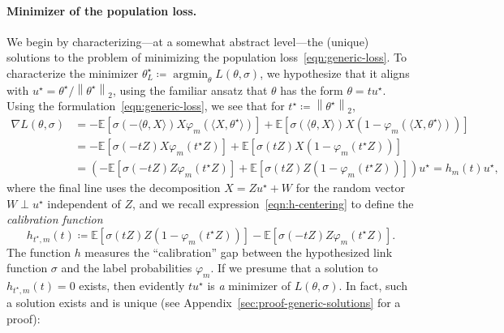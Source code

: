 \documentclass[11pt]{article}
\newcommand{\E}{\mathbb{E}}
\newcommand{\norm}[1]{\left\|{#1}\right\|} %
\newcommand{\ltwo}[1]{\norm{#1}_2} %
\newcommand{\<}{\langle} %
\renewcommand{\>}{\rangle}
\DeclareMathOperator*{\argmin}{argmin}
\newcommand{\defeq}{\coloneqq}
\newcommand{\opt}{^\star}
\begin{document}
\paragraph{Minimizer of the population loss.}
We begin by characterizing---at a somewhat abstract level---the (unique)
solutions to the problem of minimizing the population
loss~\eqref{eqn:generic-loss}.  To characterize the minimizer $\theta\opt_L
\defeq \argmin_\theta L(\theta, \sigma)$, we hypothesize that it aligns with $u\opt
= \theta\opt / \ltwo{\theta\opt}$, using the familiar
ansatz that $\theta$ has
the form $\theta = t u\opt$. Using the formulation~\eqref{eqn:generic-loss},
we see that for $t\opt \defeq \ltwo{\theta\opt}$,
\begin{align}
	\nabla L(\theta, \sigma) &
	= -\E[\sigma(-\<\theta, X\>) X
	\varphi_m(\<X, \theta\opt\>)]
	+ \E[\sigma(\<\theta, X\>) X (1 - \varphi_m(\<X, \theta\opt\>))]
	\nonumber \\
	& = -\E[\sigma(- t Z) X \varphi_m(t\opt   Z)]
	+  \E[\sigma(tZ) X (1 - \varphi_m(t\opt Z))] \nonumber \\
	& = \left(-\E[\sigma(- tZ) Z \varphi_m(t\opt Z)] 
	+ \E[\sigma(tZ) Z (1 - \varphi_m(t\opt Z))] \right) u\opt
	= h_m(t) u\opt, \label{eqn:generic-gradient}
\end{align}
where the final line uses the decomposition $X = Z u\opt + W$ for the random
vector $W \perp u\opt$ independent of $Z$, and we recall
expression~\eqref{eqn:h-centering} to define the
\emph{calibration function}
\begin{equation}
  \label{eqn:h-m-func}
  h_{t\opt, m}(t) \defeq \E[\sigma(tZ) Z (1 - \varphi_m(t\opt Z))]
  - \E[\sigma(-t Z) Z \varphi_m(t\opt Z)].
\end{equation}
The function $h$ measures the ``calibration'' gap between the
hypothesized link function $\sigma$ and the label probabilities
$\varphi_m$.
If we presume that a solution to $h_{t\opt,m}(t) = 0$ exists, then
evidently $t u\opt$ is \emph{a} minimizer of $L(\theta, \sigma)$. In fact,
such a solution exists and is unique
(see Appendix~\ref{sec:proof-generic-solutions} for a proof):

\newcommand{\Hessian}{H_L}  %
\newcommand{\hessfunc}{\mathsf{he}}  %
\newcommand{\linkerr}{\mathsf{le}}  %
\newcommand{\varfunc}{C_m}  %
\end{document}
